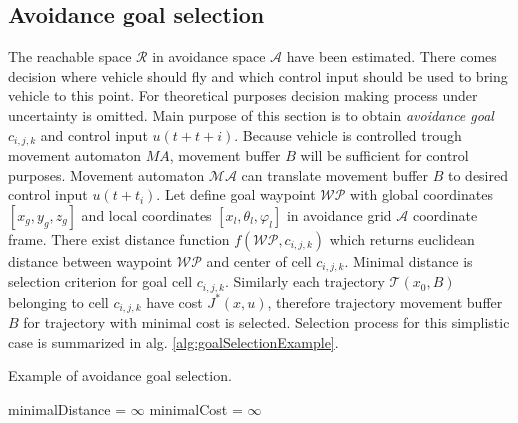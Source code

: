 \subsection{Avoidance goal selection}\label{ch:avoidanceGoalSimlistic}
\noindent The reachable space $\mathscr{R}$ in avoidance space $\mathscr{A}$ have been estimated. There comes decision where vehicle should fly and which control input should be used to bring vehicle to this point. For theoretical purposes decision making process under uncertainty is omitted. Main purpose of this section is to obtain \textit{avoidance goal} $c_{i,j,k}$ and control input $u(t+t+i)$. Because vehicle is controlled trough movement automaton $\textit{MA}$, movement buffer $B$ will be sufficient for control purposes. Movement automaton $\mathscr{MA}$ can translate movement buffer $B$ to desired control input $u(t+t_i)$.
Let define goal waypoint $\mathscr{WP}$ with global coordinates $[x_g,y_g,z_g]$ and local coordinates $[x_l,\theta_l,\varphi_l]$ in avoidance grid $\mathscr{A}$ coordinate frame. There exist distance function $f(\mathscr{WP},c_{i,j,k})$ which returns euclidean distance between waypoint $\mathscr{WP}$ and center of cell $c_{i,j,k}$. Minimal distance is selection criterion for goal cell $c_{i,j,k}$. Similarly each trajectory $\mathscr{T}(x_0,B)$ belonging to cell $c_{i,j,k}$ have cost $J^*(x,u)$, therefore trajectory movement buffer $B$ for trajectory with minimal cost is selected. Selection process for this simplistic case is summarized in alg. \ref{alg:goalSelectionExample}.  
\begin{algorithm}[H]
    \caption{Example of avoidance goal selection.}
    \label{alg:goalSelectionExample}
    minimalDistance = $\infty$\;
    minimalCost = $\infty$
    \;
\end{algorithm}

